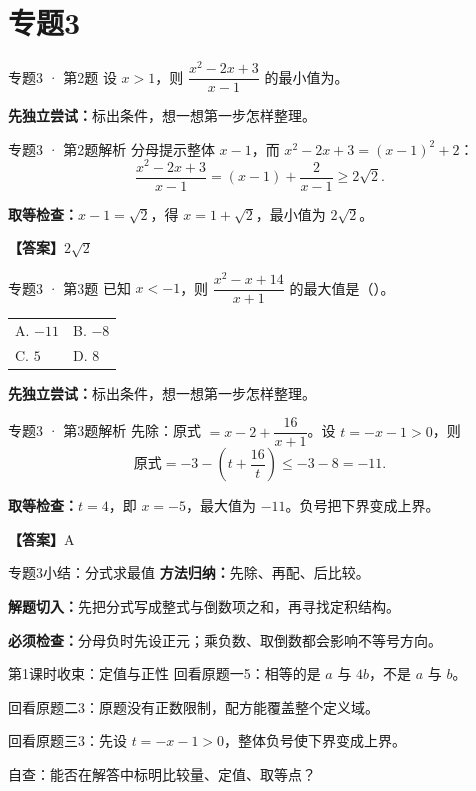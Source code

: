 \documentclass[UTF8,10pt,aspectratio=169]{ctexbeamer}
\makeatletter
\newcommand{\Answer}[1]{\par\vspace{0.2cm}\textbf{【答案】}#1}
\newcommand{\Choices}[4]{\par\vspace{0.2cm}\begin{tabular}{@{}p{0.47\textwidth}p{0.47\textwidth}@{}}A. #1 & B. #2 \\[0.15cm] C. #3 & D. #4\end{tabular}}
\makeatother
\begin{document}
\section{专题3}
\begin{frame}[t]{专题3 · 第2题}
设 $x>1$，则 $\dfrac{x^2-2x+3}{x-1}$ 的最小值为\underline{\hspace{1.5cm}}。
\par\vspace{0.3cm}\textbf{先独立尝试：}标出条件，想一想第一步怎样整理。
\end{frame}
\begin{frame}[t]{专题3 · 第2题解析}
分母提示整体 $x-1$，而 $x^2-2x+3=(x-1)^2+2$：\[\frac{x^2-2x+3}{x-1}=(x-1)+\frac2{x-1}\ge2\sqrt2.\]
\pause
\par\vspace{0.2cm}\textbf{取等检查：}$x-1=\sqrt2$，得 $x=1+\sqrt2$，最小值为 $2\sqrt2$。
\Answer{$2\sqrt2$}
\end{frame}
\begin{frame}[t]{专题3 · 第3题}
已知 $x<-1$，则 $\dfrac{x^2-x+14}{x+1}$ 的最大值是（\quad）。
\Choices{$-11$}{$-8$}{$5$}{$8$}
\par\vspace{0.3cm}\textbf{先独立尝试：}标出条件，想一想第一步怎样整理。
\end{frame}
\begin{frame}[t]{专题3 · 第3题解析}
先除：原式 $=x-2+\dfrac{16}{x+1}$。设 $t=-x-1>0$，则\[\text{原式}=-3-\left(t+\frac{16}{t}\right)\le-3-8=-11.\]
\pause
\par\vspace{0.2cm}\textbf{取等检查：}$t=4$，即 $x=-5$，最大值为 $-11$。负号把下界变成上界。
\Answer{A}
\end{frame}
\begin{frame}[t]{专题3小结：分式求最值}
\textbf{方法归纳：}先除、再配、后比较。\par\vspace{0.4cm}
\textbf{解题切入：}先把分式写成整式与倒数项之和，再寻找定积结构。\par\vspace{0.4cm}
\textbf{必须检查：}分母负时先设正元；乘负数、取倒数都会影响不等号方向。
\end{frame}
\begin{frame}[t]{第1课时收束：定值与正性}
回看原题一5：相等的是 $a$ 与 $4b$，不是 $a$ 与 $b$。\par\vspace{0.3cm}
回看原题二3：原题没有正数限制，配方能覆盖整个定义域。\par\vspace{0.3cm}
回看原题三3：先设 $t=-x-1>0$，整体负号使下界变成上界。\par\vspace{0.4cm}
自查：能否在解答中标明比较量、定值、取等点？
\end{frame}
\end{document}
